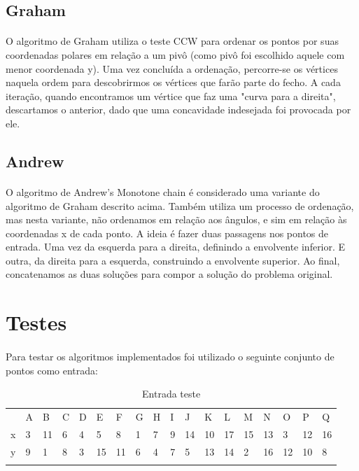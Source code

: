 \documentclass[11pt,a4paper]{article}
\begin{document}
    \subsection{Graham}
    \paragraph{}
    O algoritmo de Graham utiliza o teste CCW para ordenar os pontos por suas coordenadas polares em relação a um pivô (como pivô foi escolhido aquele com menor coordenada y). Uma vez concluída a ordenação, percorre-se os vértices naquela ordem para descobrirmos os vértices que farão parte do fecho. A cada iteração, quando encontramos um vértice que faz uma "curva para a direita", descartamos o anterior, dado que uma concavidade indesejada foi provocada por ele.

    \subsection{Andrew}
    \paragraph{}
    O algoritmo de Andrew's Monotone chain é considerado uma variante do algoritmo de Graham descrito acima. Também utiliza um processo de ordenação, mas nesta variante, não ordenamos em relação aos ângulos, e sim em relação às coordenadas x de cada ponto. A ideia é fazer duas passagens nos pontos de entrada. Uma vez da esquerda para a direita, definindo a envolvente inferior. E outra, da direita para a esquerda, construindo a envolvente superior. Ao final, concatenamos as duas soluções para compor a solução do problema original.

\clearpage
    \section{Testes}
    \paragraph{}
    Para testar os algoritmos implementados foi utilizado o seguinte conjunto de pontos como entrada:

        \begin{table}[!htb]
        \tiny
        \centering
        \caption{Entrada teste}
        \label{my-label}
        \begin{tabular}{l|l|l|l|l|l|l|l|l|l|l|l|l|l|l|l|l|l}
        \\\hline
        & A& B  & C & D & E  & F  & G & H & I & J  & K  & L  & M  & N  & O  & P  & Q    \\
        x & 3 & 11 & 6 & 4 & 5  & 8  & 1 & 7 & 9 & 14 & 10 & 17 & 15 & 13 & 3  & 12 & 16 \\
        y & 9 & 1  & 8 & 3 & 15 & 11 & 6 & 4 & 7 & 5  & 13 & 14 & 2  & 16 & 12 & 10 & 8  \\
        &   &    &   &   &    &    &   &   &   &    &    &    &    &    &    &    &                           
        \\\hline
            \end{tabular}
            \end{table}
\end{document}
